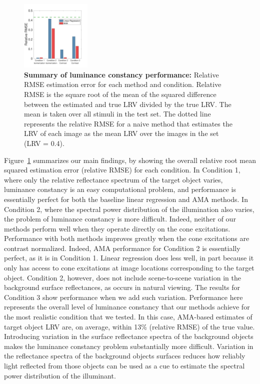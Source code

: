 \documentclass{jov}
\begin{document}
\begin{figure}
\centering
\includegraphics[width=0.3\textwidth]{../FiguresDraft5/Figure14/Figure14.pdf}
\caption{{\bf Summary of luminance constancy performance:} Relative RMSE estimation error for each method and condition. Relative RMSE is the square root of the mean of the squared difference between the estimated and true LRV divided by the true LRV. The mean is taken over all stimuli in the test set. The dotted line represents the relative RMSE for a naive method that estimates the LRV of each image as the mean LRV over the images in the set (LRV = 0.4).}
 \label{fig:barGraphs}
\end{figure}

Figure~\ref{fig:barGraphs} summarizes our main findings, by showing the overall relative root mean squared estimation error (relative RMSE) for each condition. 
In Condition 1, where only the relative reflectance spectrum of the target object varies, 
luminance constancy is an easy computational problem,
and performance is essentially perfect for both the baseline linear regression and AMA methods.
In Condition 2, where the spectral power distribution of the illumination also varies, the problem of luminance constancy is more difficult.
Indeed, neither of our methods perform well when they operate directly on the cone excitations.
Performance with both methods improves greatly when the cone excitations are contrast normalized. 
Indeed, AMA performance for Condition 2 is essentially perfect, as it is in Condition 1.
Linear regression does less well, in part because it only has access to cone excitations at image locations
corresponding to the target object.
Condition 2, however, does not include scene-to-scene variation in the background surface reflectances,
as occurs in natural viewing.
The results for Condition 3 show performance when we add such variation.
Performance here represents the overall level of luminance constancy that our methods achieve for the
most realistic condition that we tested.
In this case, AMA-based estimates of target object LRV are, on average, within 13\% (relative RMSE) of the true value.
Introducing variation in the surface reflectance spectra of the background objects makes 
the luminance constancy problem substantially more difficult. 
Variation in the reflectance spectra of the background objects surfaces reduces how 
reliably light reflected from those objects can be used as a cue to estimate the spectral power distribution of the illuminant.
\end{document}
